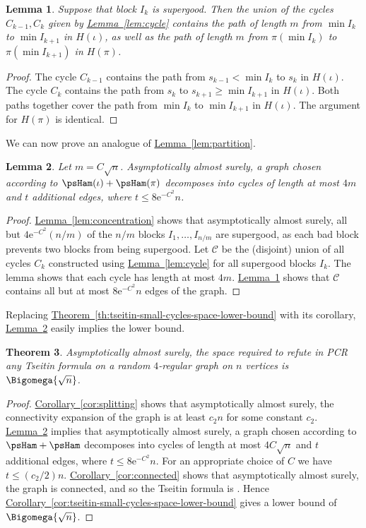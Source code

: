 \documentclass[11pt]{article}
\numberwithin{equation}{section}
\newtheorem{theorem}{Theorem}[section]
\newtheorem{lemma}[theorem]{Lemma}
\theoremstyle{definition}
\theoremstyle{plain}
\newcommand{\eee}{\mathrm e}
\newcommand{\expref}[2]{\hyperref[#2]{#1~\ref{#2}}}
\begin{document}
\begin{lemma} \label{lem:supergood}
 Suppose that block $I_k$ is supergood. Then the union of the cycles $C_{k-1},C_k$ given by \expref{Lemma}{lem:cycle} contains the path of length $m$ from $\min I_k$ to $\min I_{k+1}$ in $H(\iota)$, as well as the path of length $m$ from $\pi(\min I_k)$ to $\pi(\min I_{k+1})$ in $H(\pi)$.
\end{lemma}
\begin{proof}
 The cycle $C_{k-1}$ contains the path from $s_{k-1} < \min I_k$ to $s_k$ in $H(\iota)$. The cycle $C_k$ contains the path from $s_k$ to $s_{k+1} \geq \min I_{k+1}$ in $H(\iota)$. Both paths together cover the path from $\min I_k$ to $\min I_{k+1}$ in $H(\iota)$. The argument for $H(\pi)$ is identical.
\end{proof}

We can now prove an analogue of \expref{Lemma}{lem:partition}.

\begin{lemma} \label{lem:almost-partition}
 Let $m = C\sqrt{n}$. Asymptotically almost surely, a graph chosen according to $\psHam(\iota) + \psHam(\pi)$ decomposes into cycles of %
 length at most $4m$ and $t$ additional edges, where $t \leq 8\eee^{-C^2}n$.
\end{lemma}
\begin{proof}
 \expref{Lemma}{lem:concentration} shows that asymptotically almost surely, all but $4\eee^{-C^2} (n/m)$ of the $n/m$ blocks $I_1,\ldots,I_{n/m}$ are supergood, as each bad block prevents two blocks from being supergood. Let $\mathcal{C}$ be the (disjoint) union of all cycles $C_k$ constructed using \expref{Lemma}{lem:cycle} for all supergood blocks $I_k$. The lemma shows that each cycle has %
 length at most $4m$. \expref{Lemma}{lem:supergood} shows that $\mathcal{C}$ contains all but at most $8\eee^{-C^2} n$ edges of the graph.
\end{proof}

Replacing \expref{Theorem}{th:tseitin-small-cycles-space-lower-bound} with its corollary, \expref{Lemma}{lem:almost-partition} easily implies the lower bound.

\begin{theorem} \label{thm:improved}
 Asymptotically almost surely, the space required to refute in PCR any Tseitin formula on a random $4$-regular graph on $n$ vertices is $\Bigomega{\sqrt{n}}$.
\end{theorem}
\begin{proof}
  \expref{Corollary}{cor:splitting} shows that asymptotically almost surely, the connectivity expansion of the graph is at least $c_2 n$ %
  for some constant $c_2$. %
  \expref{Lemma}{lem:almost-partition} implies that asymptotically almost surely, a graph chosen according to $\psHam + \psHam$ decomposes into cycles of %
 length at most $4C\sqrt{n}$ and $t$ additional edges, where $t \leq 8\eee^{-C^2}n$. For an appropriate choice of $C$ we have $t \leq (c_2/2)n$.
 \expref{Corollary}{cor:connected} shows that asymptotically almost surely, the graph is connected, and so the Tseitin formula is \Gnonsplittingnot.
 Hence \expref{Corollary}{cor:tseitin-small-cycles-space-lower-bound} gives a lower bound of $\Bigomega{\sqrt{n}}$.
\end{proof}
\end{document}

